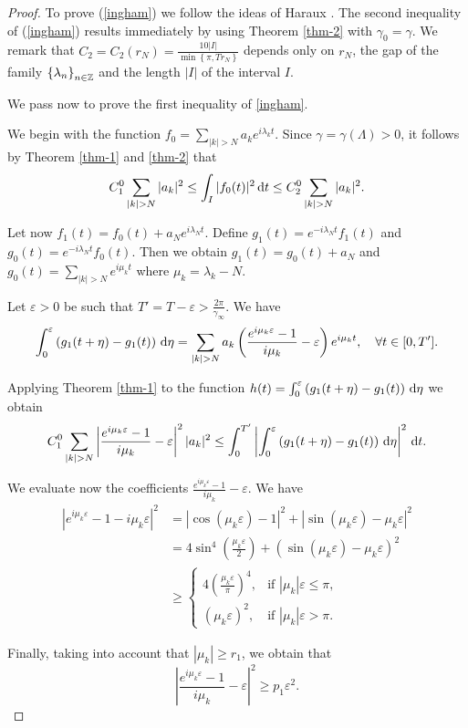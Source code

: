 \begin{proof}
  To prove (\ref{ingham}) we follow the ideas of Haraux \cite{Haraux}. The second inequality of (\ref{ingham}) results immediately by using Theorem \ref{thm-2} with $\gamma_0=\gamma$. We remark that $C_2=C_2(r_N)=\frac{10|I|}{\min \left\{\pi,Tr_N\right\} }$ depends only on $r_N$, the gap of the family $\left\{\lambda_n\right\} _{n\in \mathbb{Z}}$ and the length $ |I|$ of the interval $I$.

  We pass now to prove the first inequality of \ref{ingham}.
  
  We begin with the function $f_0=\sum_{|k|>N}a_k e^{i\lambda_k t}$. Since $\gamma=\gamma(\Lambda)>0$, it follows by Theorem \ref{thm-1} and \ref{thm-2} that 
  \begin{equation}
    C_1^0 \sum_{|k|>N}^{} |a_k|^2\le \int_{I}|f_0(t)|^2\d t\le C_2^{0}\sum_{|k|>N}^{} |a_k|^2.
  \end{equation}

  Let now $f_1(t)=f_0(t)+a_N e^{i\lambda_N t}$. Define $g_1(t)=e^{-i \lambda_N t}f_1(t)$ and $g_0(t)=e^{-i \lambda_N t}f_0(t)$. Then we obtain $g_1(t)=g_0(t)+a_N$ and $g_0(t)=\sum_{|k|>N}^{} e^{i\mu_k t}$ where $\mu_k=\lambda_k-N$.

  Let $\varepsilon >0$ be such that $T'=T-\varepsilon >\frac{2\pi}{\gamma_{\infty}}$. We have
  \[
    \int_{0}^{\varepsilon }\left( g_1(t+\eta)-g_1(t) \right) \d \eta=\sum_{|k|>N}^{} a_k\left( \frac{e^{i\mu_k \varepsilon }-1}{i\mu_k}-\varepsilon  \right) e^{i\mu_k t},\quad \forall t \in [0,T'].
  \]

  Applying Theorem \ref{thm-1} to the function $h(t)=\int_{0}^{\varepsilon }\left( g_1(t+\eta)-g_1(t) \right) \,\mathrm{d} \eta $ we obtain 
  \begin{equation}
    C_1^{0}\sum_{|k|>N}^{} \left| \frac{e^{i \mu_k \varepsilon }-1}{i\mu_k}-\varepsilon  \right| ^2|a_k|^2\le \int_0^{T'}\left| \int_0^{\varepsilon }\left( g_1(t+\eta)-g_1(t) \right) \d \eta  \right| ^2\d t.
  \end{equation}
  
  We evaluate now the coefficients $\frac{e^{i\mu_k\varepsilon }-1}{i\mu_k}-\varepsilon $. We have
  \begin{align*}
    \left| e^{i\mu_k \varepsilon }-1-i\mu_k\varepsilon  \right| ^2 &= \left| \cos(\mu_k\varepsilon )-1 \right| ^2+\left| \sin(\mu_k\varepsilon )-\mu_k\varepsilon  \right| ^2\\
								   &= 4\sin ^{4}\left( \frac{\mu_k\varepsilon }{2} \right) +\left( \sin\left( \mu_k\varepsilon  \right) -\mu_k\varepsilon  \right) ^2\\
								   &\ge \begin{cases}
								     4\left( \frac{\mu_k\varepsilon }{\pi} \right) ^{4}, & \text{if }|\mu_k|\varepsilon \le \pi,\\
								     \left( \mu_k\varepsilon  \right) ^2, & \text{if }|\mu_k|\varepsilon >\pi.
								   \end{cases}
  \end{align*}

  Finally, taking into account that $|\mu_k|\ge r_1$, we obtain that
  \[
  \left| \frac{e^{i\mu_k\varepsilon }-1}{i\mu_k}-\varepsilon  \right| ^2\ge p_1\varepsilon ^2.
  \] 
\end{proof}
\fi

